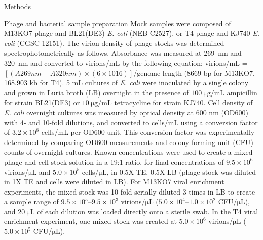 \documentclass[oneside,12pt,final]{sty/ucthesis-CA2012}
\begin{document}
\begin{mainmatter}
\begin{section}{Methods}
\begin{subsection}{Phage and bacterial sample preparation}
Mock samples were composed of M13KO7 phage and BL21(DE3) \textit{E. coli} (NEB C2527), or T4 phage and KJ740 \textit{E. coli} (CGSC 12151). The virion density of phage stocks was determined spectrophotometrically as follows. Absorbance was measured at \SI{269}{\nano\meter} and \SI{320}{\nano\meter} and converted to virions/\si{\milli\liter} by the following equation: virions/\si{\milli\liter} = $[(A269 nm - A320 nm) \times (6 \times 1016)]$/genome length (8669 bp for M13KO7, 168.903 kb for T4). 5 mL cultures of \textit{E. coli} were inoculated by a single colony and grown in Luria broth (LB) overnight in the presence of $\SI{100}{\micro\gram\per\mL}$ ampicillin for strain BL21(DE3) or $\SI{10}{\micro\gram\per\mL}$ tetracycline for strain KJ740. Cell density of \textit{E. coli} overnight cultures was measured by optical density at 600 nm (OD600) with 4- and 10-fold dilutions, and converted to cells/mL using a conversion factor of $3.2 \times 10^{8}$ cells/mL per OD600 unit. This conversion factor was experimentally determined by comparing OD600 measurements and colony-forming unit (CFU) counts of overnight cultures. Known concentrations were used to create a mixed phage and cell stock solution in a 19:1 ratio, for final concentrations of $9.5 \times 10^{6}$ virions/$\si{\micro\liter}$ and $5.0 \times 10^{5}$ cells/$\si{\micro\liter}$, in 0.5X TE, 0.5X LB (phage stock was diluted in 1X TE and cells were diluted in LB). For M13KO7 viral enrichment experiments, the mixed stock was 10-fold serially diluted 3 times in LB to create a sample range of $9.5 \times 10^{5} – 9.5 \times 10^{3}$ virions/$\si{\micro\liter}$ ($5.0 \times 10^{4} – 1.0 \times 10^{2}$ CFU/$\si{\micro\liter}$), and $\SI{20}{\micro\liter}$ of each dilution was loaded directly onto a sterile swab. In the T4 viral enrichment experiment, one mixed stock was created at $5.0 \times 10^{6}$ virions/$\si{\micro\liter}$ ($5.0 \times 10^{5}$ CFU/$\si{\micro\liter}$).
\end{subsection}


\end{section}
\end{mainmatter}
\end{document}
